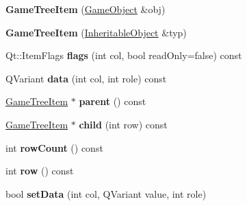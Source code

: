 \begin{DoxyCompactItemize}
\item 
\hypertarget{class_game_tree_item_a9adc3e57c7bb54da47bdba04167f3f20}{{\bfseries \-Game\-Tree\-Item} (\hyperlink{class_game_object}{\-Game\-Object} \&obj)}\label{class_game_tree_item_a9adc3e57c7bb54da47bdba04167f3f20}

\item 
\hypertarget{class_game_tree_item_aabbf10fc4c128d50bda34e50400bc37e}{{\bfseries \-Game\-Tree\-Item} (\hyperlink{class_inheritable_object}{\-Inheritable\-Object} \&typ)}\label{class_game_tree_item_aabbf10fc4c128d50bda34e50400bc37e}

\item 
\hypertarget{class_game_tree_item_a0a10b4b1ca21275beb5246dddbc61366}{\-Qt\-::\-Item\-Flags {\bfseries flags} (int col, bool read\-Only=false) const }\label{class_game_tree_item_a0a10b4b1ca21275beb5246dddbc61366}

\item 
\hypertarget{class_game_tree_item_ac6432307dd6dfcdf061811b80a254690}{\-Q\-Variant {\bfseries data} (int col, int role) const }\label{class_game_tree_item_ac6432307dd6dfcdf061811b80a254690}

\item 
\hypertarget{class_game_tree_item_a0c3616c8cd7f08e1fb74bc00bf274150}{\hyperlink{class_game_tree_item}{\-Game\-Tree\-Item} $\ast$ {\bfseries parent} () const }\label{class_game_tree_item_a0c3616c8cd7f08e1fb74bc00bf274150}

\item 
\hypertarget{class_game_tree_item_a608c03c95353ff41081f4e2f4824fb11}{\hyperlink{class_game_tree_item}{\-Game\-Tree\-Item} $\ast$ {\bfseries child} (int row) const }\label{class_game_tree_item_a608c03c95353ff41081f4e2f4824fb11}

\item 
\hypertarget{class_game_tree_item_a1e4d97a548b4fb57c774a438f6e71260}{int {\bfseries row\-Count} () const }\label{class_game_tree_item_a1e4d97a548b4fb57c774a438f6e71260}

\item 
\hypertarget{class_game_tree_item_a6f6dccb2600fab0ce91b1bb286e3b91a}{int {\bfseries row} () const }\label{class_game_tree_item_a6f6dccb2600fab0ce91b1bb286e3b91a}

\item 
\hypertarget{class_game_tree_item_a4bcc79ba8a485272dc202ed9492170b5}{bool {\bfseries set\-Data} (int col, \-Q\-Variant value, int role)}\label{class_game_tree_item_a4bcc79ba8a485272dc202ed9492170b5}


\end{DoxyCompactItemize}

